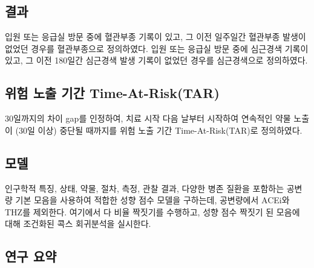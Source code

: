 \documentclass[10.5pt]{book}
\theoremstyle{definition}
\theoremstyle{definition}
\theoremstyle{definition}
\theoremstyle{remark}
\begin{document}
\subsection{결과}\label{-2}

입원 또는 응급실 방문 중에 혈관부종 기록이 있고, 그 이전 일주일간
혈관부종 발생이 없었던 경우를 혈관부종으로 정의하였다. 입원 또는 응급실
방문 중에 심근경색 기록이 있고, 그 이전 180일간 심근경색 발생 기록이
없었던 경우를 심근경색으로 정의하였다.

\subsection{위험 노출 기간 Time-At-Risk(TAR)}\label{---time-at-risktar}

30일까지의 차이 gap를 인정하여, 치료 시작 다음 날부터 시작하여 연속적인
약물 노출이 (30일 이상) 중단될 때까지를 위험 노출 기간
Time-At-Risk(TAR)로 정의하였다.

\subsection{모델}

인구학적 특징, 상태, 약물, 절차, 측정, 관찰 결과, 다양한 병존 질환을
포함하는 공변량 기본 모음을 사용하여 적합한 성향 점수 모델을 구하는데,
공변량에서 ACEi와 THZ를 제외한다. 여기에서 다 비율 짝짓기를 수행하고,
성향 점수 짝짓기 된 모음에 대해 조건화된 콕스 회귀분석을 실시한다.

\subsection{연구 요약}\label{-}
\end{document}
